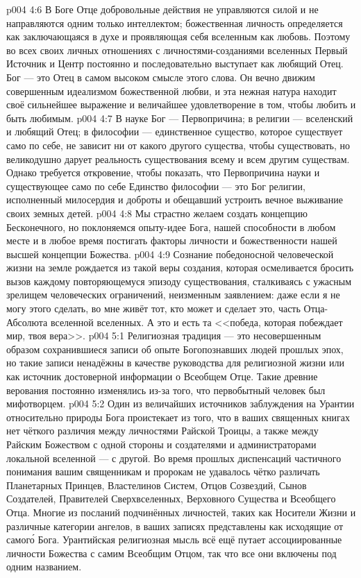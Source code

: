 \vs p004 4:6 В Боге Отце добровольные действия не управляются силой и не направляются одним только интеллектом; божественная личность определяется как заключающаяся в духе и проявляющая себя вселенным как любовь. Поэтому во всех своих личных отношениях с личностями\hyp{}созданиями вселенных Первый Источник и Центр постоянно и последовательно выступает как любящий Отец. Бог --- это Отец в самом высоком смысле этого слова. Он вечно движим совершенным идеализмом божественной любви, и эта нежная натура находит своё сильнейшее выражение и величайшее удовлетворение в том, чтобы любить и быть любимым.
\vs p004 4:7 \pc В науке Бог --- Первопричина; в религии --- вселенский и любящий Отец; в философии --- единственное существо, которое существует само по себе, не зависит ни от какого другого существа, чтобы существовать, но великодушно дарует реальность существования всему и всем другим существам. Однако требуется откровение, чтобы показать, что Первопричина науки и существующее само по себе Единство философии --- это Бог религии, исполненный милосердия и доброты и обещавший устроить вечное выживание своих земных детей.
\vs p004 4:8 Мы страстно желаем создать концепцию Бесконечного, но поклоняемся опыту\hyp{}идее Бога, нашей способности в любом месте и в любое время постигать факторы личности и божественности нашей высшей концепции Божества.
\vs p004 4:9 Сознание победоносной человеческой жизни на земле рождается из такой веры создания, которая осмеливается бросить вызов каждому повторяющемуся эпизоду существования, сталкиваясь с ужасным зрелищем человеческих ограничений, неизменным заявлением: даже если я не могу этого сделать, во мне живёт тот, кто может и сделает это, часть Отца\hyp{}Абсолюта вселенной вселенных. А это и есть та <<победа, которая побеждает мир, твоя вера>>.
\vs p004 5:1 Религиозная традиция --- это несовершенным образом сохранившиеся записи об опыте Богопознавших людей прошлых эпох, но такие записи ненадёжны в качестве руководства для религиозной жизни или как источник достоверной информации о Всеобщем Отце. Такие древние верования постоянно изменялись из\hyp{}за того, что первобытный человек был мифотворцем.
\vs p004 5:2 Один из величайших источников заблуждения на Урантии относительно природы Бога проистекает из того, что в ваших священных книгах нет чёткого различия между личностями Райской Троицы, а также между Райским Божеством с одной стороны и создателями и администраторами локальной вселенной --- с другой. Во время прошлых диспенсаций частичного понимания вашим священникам и пророкам не удавалось чётко различать Планетарных Принцев, Властелинов Систем, Отцов Созвездий, Сынов Создателей, Правителей Сверхвселенных, Верховного Существа и Всеобщего Отца. Многие из посланий подчинённых личностей, таких как Носители Жизни и различные категории ангелов, в ваших записях представлены как исходящие от самог\'о Бога. Урантийская религиозная мысль всё ещё путает ассоциированные личности Божества с самим Всеобщим Отцом, так что все они включены под одним названием.
